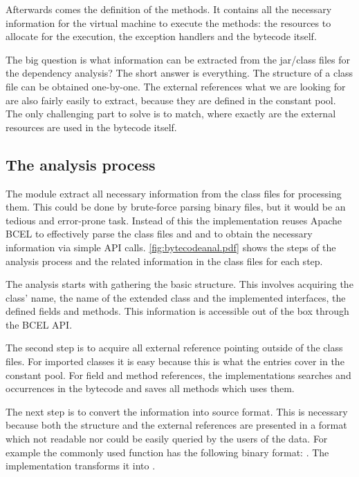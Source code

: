 Afterwards comes the definition of the methods. It contains all the necessary
information for the virtual machine to execute the methods: the resources to 
allocate for the execution, the exception handlers and the bytecode itself. 

The big question is what information can be extracted from the jar/class files
for the dependency analysis? The short answer is everything. The structure of a
class file can be obtained one-by-one. The external references what we are
looking for are also fairly easily to extract, because they are defined in the
constant pool. The only challenging part to solve is to match, where exactly are
the external resources are used in the bytecode itself.


\subsection{The analysis process}
The module extract all necessary information from the class files for processing
them. This could be done by brute-force parsing binary files, but it would be an
tedious and error-prone task. Instead of this the implementation reuses Apache
BCEL to effectively parse the class files and and to obtain the necessary
information via simple API calls.
\autoref{fig:bytecodeanal.pdf} shows the steps of the analysis process and the
related information in the class files for each step. 

The analysis starts with gathering the basic structure. This involves acquiring
the class' name, the name of the extended class and the implemented interfaces,
the defined fields and methods. This information is accessible out of the box
through the BCEL API.  

The second step is to acquire all external reference pointing outside of the
class files. For imported classes it is easy because this is what the
 entries cover in the constant pool. For field and method
references, the implementations searches  and
 occurrences in the bytecode and saves all methods 
which uses them.

The next step is to convert the information into source format. This is
necessary because both the structure and the external references are presented
in a format which not readable nor could be easily queried by the users of the
data. For example the commonly used  function has the
following binary format: . The implementation
transforms it into .

